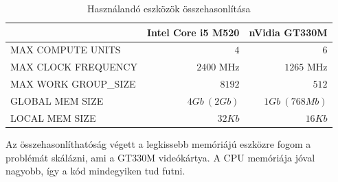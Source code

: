 	\begin{table}[!ht]
	\renewcommand{\arraystretch}{1.3}
	\setlength{\extrarowheight}{8pt}
	\caption{Használandó eszközök összehasonlítása}
	\label{table:envs}
	\centering
	\footnotesize
	
	\begin{tabular}{ l | r | r}
		 & Intel Core i5 M520 & nVidia GT330M \\ \hline
		MAX COMPUTE UNITS & $4$ & $6$\\
		MAX CLOCK FREQUENCY & $2400$ MHz & $1265$ MHz \\
		MAX WORK GROUP\_SIZE & $8192$ & $512$ \\ \hline\hline
		GLOBAL MEM SIZE & $4Gb\ (2Gb)$ & $1Gb\ (768 Mb)$\\
		LOCAL MEM SIZE & $32 Kb$ & $16 Kb$\\
	\end{tabular}
	\end{table}
	
	Az összehasonlíthatóság végett a legkissebb memóriájú eszközre fogom a problémát skálázni, ami a
	GT330M videókártya. A CPU memóriája jóval nagyobb, így a kód mindegyiken tud futni.




